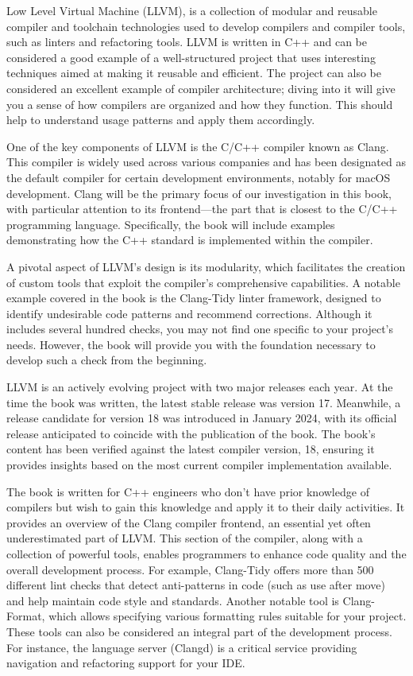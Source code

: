 Low Level Virtual Machine (LLVM), is a collection of modular and reusable compiler and toolchain technologies used to develop compilers and compiler tools, such as linters and refactoring tools. LLVM is written in C++ and can be considered a good example of a well-structured project that uses interesting techniques aimed at making it reusable and efficient. The project can also be considered an excellent example of compiler architecture; diving into it will give you a sense of how compilers are organized and how they function. This should help to understand usage patterns and apply them accordingly.

One of the key components of LLVM is the C/C++ compiler known as Clang. This compiler is widely used across various companies and has been designated as the default compiler for certain development environments, notably for macOS development. Clang will be the primary focus of our investigation in this book, with particular attention to its frontend—the part that is closest to the C/C++ programming language. Specifically, the book will include examples demonstrating how the C++ standard is implemented within the compiler.

A pivotal aspect of LLVM's design is its modularity, which facilitates the creation of custom tools that exploit the compiler's comprehensive capabilities. A notable example covered in the book is the Clang-Tidy linter framework, designed to identify undesirable code patterns and recommend corrections. Although it includes several hundred checks, you may not find one specific to your project's needs. However, the book will provide you with the foundation necessary to develop such a check from the beginning.

LLVM is an actively evolving project with two major releases each year. At the time the book was written, the latest stable release was version 17. Meanwhile, a release candidate for version 18 was introduced in January 2024, with its official release anticipated to coincide with the publication of the book. The book's content has been verified against the latest compiler version, 18, ensuring it provides insights based on the most current compiler implementation available.


The book is written for C++ engineers who don't have prior knowledge of compilers but wish to gain this knowledge and apply it to their daily activities. It provides an overview of the Clang compiler frontend, an essential yet often underestimated part of LLVM. This section of the compiler, along with a collection of powerful tools, enables programmers to enhance code quality and the overall development process. For example, Clang-Tidy offers more than 500 different lint checks that detect anti-patterns in code (such as use after move) and help maintain code style and standards. Another notable tool is Clang-Format, which allows specifying various formatting rules suitable for your project. These tools can also be considered an integral part of the development process. For instance, the language server (Clangd) is a critical service providing navigation and refactoring support for your IDE.

